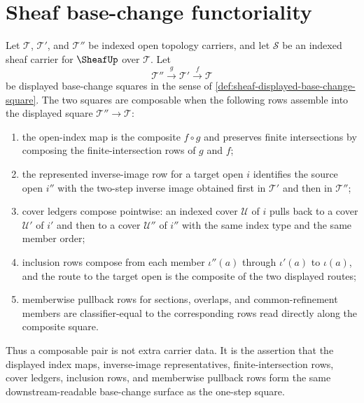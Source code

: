\section{Sheaf base-change functoriality}
\label{sec:sheaf-base-change-functoriality}

\begin{definition}
\label{def:sheaf-composable-base-change-squares}
Let $\mathcal{T}$, $\mathcal{T}'$, and $\mathcal{T}''$ be indexed open topology carriers, and let $\mathcal{S}$ be an indexed sheaf carrier for $\SheafUp$ over $\mathcal{T}$. Let
$$
\mathcal{T}''\xrightarrow{g}\mathcal{T}'\xrightarrow{f}\mathcal{T}
$$
be displayed base-change squares in the sense of \autoref{def:sheaf-displayed-base-change-square}. The two squares are composable when the following rows assemble into the displayed square $\mathcal{T}''\to\mathcal{T}$:
\begin{enumerate}
\item the open-index map is the composite $f\circ g$ and preserves finite intersections by composing the finite-intersection rows of $g$ and $f$;
\item the represented inverse-image row for a target open $i$ identifies the source open $i''$ with the two-step inverse image obtained first in $\mathcal{T}'$ and then in $\mathcal{T}''$;
\item cover ledgers compose pointwise: an indexed cover $\mathcal{U}$ of $i$ pulls back to a cover $\mathcal{U}'$ of $i'$ and then to a cover $\mathcal{U}''$ of $i''$ with the same index type and the same member order;
\item inclusion rows compose from each member $\iota''(a)$ through $\iota'(a)$ to $\iota(a)$, and the route to the target open is the composite of the two displayed routes;
\item memberwise pullback rows for sections, overlaps, and common-refinement members are classifier-equal to the corresponding rows read directly along the composite square.
\end{enumerate}
Thus a composable pair is not extra carrier data. It is the assertion that the displayed index maps, inverse-image representatives, finite-intersection rows, cover ledgers, inclusion rows, and memberwise pullback rows form the same downstream-readable base-change surface as the one-step square.
\end{definition}

